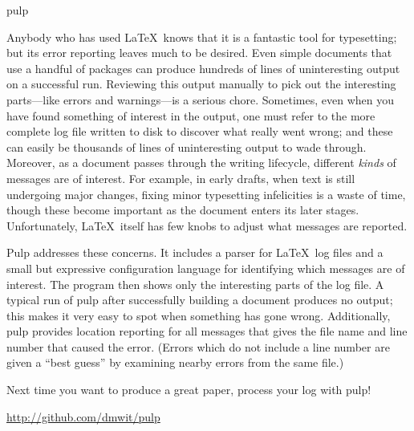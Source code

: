 \documentclass{scrreprt}
\begin{document}
\begin{hcarentry}{pulp}
\makeheader

Anybody who has used \LaTeX\ knows that it is a fantastic tool for
typesetting; but its error reporting leaves much to be desired. Even simple
documents that use a handful of packages can produce hundreds of lines of
uninteresting output on a successful run. Reviewing this output manually to
pick out the interesting parts---like errors and warnings---is a serious
chore. Sometimes, even when you have found something of interest in the
output, one must refer to the more complete log file written to disk to
discover what really went wrong; and these can easily be thousands of lines
of uninteresting output to wade through. Moreover, as a document passes
through the writing lifecycle, different \emph{kinds} of messages are of
interest. For example, in early drafts, when text is still undergoing major
changes, fixing minor typesetting infelicities is a waste of time, though
these become important as the document enters its later stages.
Unfortunately, \LaTeX\ itself has few knobs to adjust what messages are
reported.

Pulp addresses these concerns. It includes a parser for \LaTeX\ log files
and a small but expressive configuration language for identifying which
messages are of interest. The program then shows only the interesting parts
of the log file. A typical run of pulp after successfully building a
document produces no output; this makes it very easy to spot when something
has gone wrong. Additionally, pulp provides location reporting for all
messages that gives the file name and line number that caused the error.
(Errors which do not include a line number are given a ``best guess'' by
examining nearby errors from the same file.)

Next time you want to produce a great paper, process your log with pulp!

%
%
%
%

\FurtherReading
  \url{http://github.com/dmwit/pulp}
\end{hcarentry}
\end{document}
